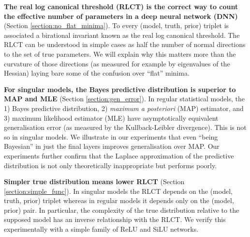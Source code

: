 \documentclass{article} %
\begin{document}
\textbf{The real log canonical threshold (RLCT) is the correct way to count the effective number of parameters in a deep neural network (DNN)} (Section \ref{section:no_flat_minima}). 
    To every (model, truth, prior) triplet is associated a birational invariant known as the real log canonical threshold. The RLCT can be understood in simple cases as half the number of normal directions to the set of true parameters. We will explain why this matters more than the curvature of those directions (as measured for example by eigenvalues of the Hessian) laying bare some of the confusion over ``flat'' minima. 

\textbf{For singular models, the Bayes predictive distribution is superior to MAP and MLE} (Section \ref{section:gen_error}). In regular statistical models,  the 1) Bayes predictive distribution, 2) \textit{maximum a posteriori} (MAP) estimator, and 3) maximum likelihood estimator (MLE) have asymptotically equivalent generalisation error (as measured by the Kullback-Leibler divergence). This is not so in singular models. We illustrate in our experiments that even ``being Bayesian'' in just the final layers improves generalisation over MAP. Our experiments further confirm that the Laplace approximation of the predictive distribution \citet{smith2017bayesian,zhang_energyentropy_2018} is not only theoretically inappropriate but performs poorly.

\textbf{Simpler true distribution means lower RLCT} (Section \ref{section:simple_func}). In singular models the RLCT depends on the (model, truth, prior) triplet whereas in regular models it depends only on the (model, prior) pair. In particular, the complexity of the true distribution relative to the supposed model has an inverse relationship with the RLCT. We verify this experimentally with a simple family of ReLU and SiLU networks. 
\end{document}
